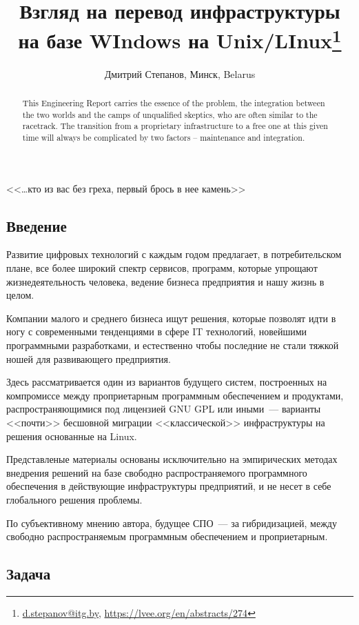 \documentclass[10pt, a5paper]{article}
\begin{document}
\title{Взгляд на перевод инфраструктуры на базе WIndows на Unix/LInux\footnote{\url{d.stepanov@itg.by}, \url{https://lvee.org/en/abstracts/274}}}
\author{Дмитрий Степанов, Минск, Belarus}
\maketitle
\begin{abstract}
This Engineering Report carries the essence of the problem, the integration between the two worlds and the camps of unqualified skeptics, who are often similar to the racetrack. 
The transition from a proprietary infrastructure to a free one at this given time will always be complicated by two factors -- maintenance and integration.
\end{abstract}
<<\ldots{}кто из вас без греха, первый брось в нее камень>>

\subsection*{Введение}

Развитие цифровых технологий с каждым годом предлагает, в потребительском плане, все более широкий спектр сервисов, программ, которые упрощают жизнедеятельность человека, ведение бизнеса предприятия и нашу жизнь в целом.

Компании малого и среднего бизнеса ищут решения, которые позволят идти в ногу с современными тенденциями в сфере IT технологий, новейшими программными разработками, и естественно чтобы последние не стали тяжкой ношей для развивающего предприятия.

Здесь рассматривается один из вариантов будущего систем, построенных на компромиссе между проприетарным программным обеспечением и продуктами, распространяющимися под лицензией GNU GPL или иными~--- варианты <<почти>> бесшовной миграции <<классической>> инфраструктуры на решения основанные на Linux.

Представленые материалы основаны исключительно на эмпирических методах внедрения решений на базе свободно распространяемого программного обеспечения в действующие инфраструктуры предприятий, и не несет в себе глобального решения проблемы.

По субъективному мнению автора, будущее СПО~--- за гибридизацией, между свободно распространяемым программным обеспечением и проприетарным.

\subsection*{Задача}
\end{document}

